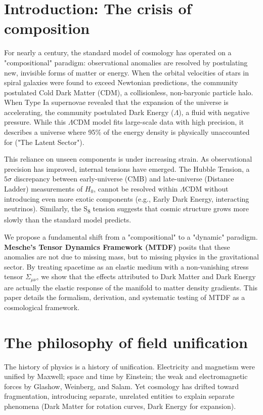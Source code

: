 \documentclass[11pt,a4paper]{article}
\begin{document}
\section{Introduction: The crisis of composition}
\label{sec:sec1}
For nearly a century, the standard model of cosmology has operated on a "compositional" paradigm: observational anomalies are resolved by postulating new, invisible forms of matter or energy. When the orbital velocities of stars in spiral galaxies were found to exceed Newtonian predictions, the community postulated Cold Dark Matter (CDM), a collisionless, non-baryonic particle halo. When Type Ia supernovae revealed that the expansion of the universe is accelerating, the community postulated Dark Energy ($\Lambda$), a fluid with negative pressure. While this $\Lambda$CDM model fits large-scale data with high precision, it describes a universe where 95\% of the energy density is physically unaccounted for ("The Latent Sector").

This reliance on unseen components is under increasing strain. As observational precision has improved, internal tensions have emerged. The Hubble Tension, a $5\sigma$ discrepancy between early-universe (CMB) and late-universe (Distance Ladder) measurements of $H_0$, cannot be resolved within $\Lambda$CDM without introducing even more exotic components (e.g., Early Dark Energy, interacting neutrinos). Similarly, the S\textsubscript{8} tension suggests that cosmic structure grows more slowly than the standard model predicts.

We propose a fundamental shift from a "compositional" to a "dynamic" paradigm. \textbf{Mesche's Tensor Dynamics Framework (MTDF)} posits that these anomalies are not due to missing mass, but to missing physics in the gravitational sector. By treating spacetime as an elastic medium with a non-vanishing stress tensor $\Sigma_{\mu\nu}$, we show that the effects attributed to Dark Matter and Dark Energy are actually the elastic response of the manifold to matter density gradients. This paper details the formalism, derivation, and systematic testing of MTDF as a cosmological framework.

\section{The philosophy of field unification}
\label{sec:sec2}
The history of physics is a history of unification. Electricity and magnetism were unified by Maxwell; space and time by Einstein; the weak and electromagnetic forces by Glashow, Weinberg, and Salam. Yet cosmology has drifted toward fragmentation, introducing separate, unrelated entities to explain separate phenomena (Dark Matter for rotation curves, Dark Energy for expansion).
\end{document}
